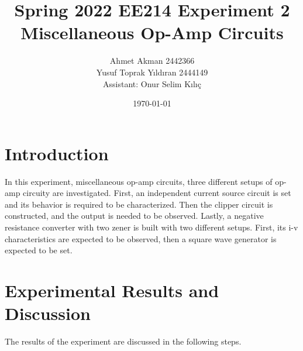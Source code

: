 \documentclass[letterpaper,12pt]{article}
\begin{document}
\thispagestyle{empty}

\title{Spring 2022 EE214 Experiment 2  \protect\\ Miscellaneous Op-Amp Circuits}
\author{Ahmet Akman 2442366 \protect\\ Yusuf Toprak Yıldıran 2444149 \protect\\ Assistant: Onur Selim Kılıç}
\date{\today}
\maketitle
\tableofcontents
\section{Introduction}
In this experiment, miscellaneous op-amp circuits, three different setups of op-amp circuity are investigated. First, an independent current source circuit is set and its behavior is required to be characterized. Then the clipper circuit is constructed, and the output is needed to be observed. Lastly, a negative resistance converter with two zener is built with two different setups. First, its i-v characteristics are expected to be observed, then a square wave generator is expected to be set.
\section{Experimental Results and Discussion}
The results of the experiment are discussed in the following steps.
\end{document}
